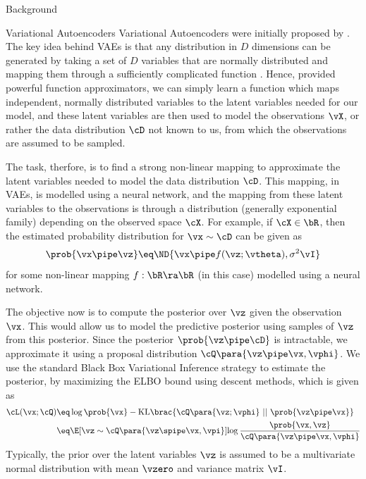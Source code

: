 \documentclass{article}
\begin{document}
\begin{psection}{Background}
	\begin{psubsection}{Variational Autoencoders}
		Variational Autoencoders were initially proposed by \cite{vae}. The key idea behind VAEs is that any distribution in $D$ dimensions can be generated by taking a set of $D$ variables that are normally distributed and mapping them through a sufficiently complicated function \citep{vae-tut}. Hence, provided powerful function approximators, we can simply learn a function which maps independent, normally distributed variables to the latent variables needed for our model, and these latent variables are then used to model the observations $\vX$, or rather the data distribution $\cD$ not known to us, from which the observations are assumed to be sampled.

		The task, therfore, is to find a strong non-linear mapping to approximate the latent variables needed to model the data distribution $\cD$. This mapping, in VAEs, is modelled using a neural network, and the mapping from these latent variables to the observations is through a distribution (generally exponential family) depending on the observed space $\cX$. For example, if $\cX \in \bR$, then the estimated probability distribution for $\vx \sim \cD$ can be given as
		\begin{align*}
			\prob{\vx \pipe \vz} \eq \ND{\vx \pipe f(\vz; \vtheta), \sigma^2 \vI}
		\end{align*}
		for some non-linear mapping $f: \bR \ra \bR$ (in this case) modelled using a neural network.

		The objective now is to compute the posterior over $\vz$ given the observation $\vx$. This would allow us to model the predictive posterior using samples of $\vz$ from this posterior. Since the posterior $\prob{\vz \pipe \cD}$ is intractable, we approximate it using a proposal distribution $\cQ\para{\vz \pipe \vx, \vphi}$. We use the standard Black Box Variational Inference strategy to estimate the posterior, by maximizing the ELBO bound using descent methods, which is given as
		\begin{align*}
			\cL(\vx; \cQ) &\eq \log{\prob{\vx}} - \text{KL}\brac{\cQ\para{\vz; \vphi}\ ||\ \prob{\vz \pipe \vx}} \\
			&\eq \E[\vz \sim \cQ\para{\vz \spipe \vx, \vpi}]{\log{\frac{\prob{\vx, \vz}}{\cQ\para{\vz \pipe \vx, \vphi}}}}
		\end{align*}
		Typically, the prior over the latent variables $\vz$ is assumed to be a multivariate normal distribution with mean $\vzero$ and variance matrix $\vI$.


\end{psubsection}
\end{psection}
\end{document}
